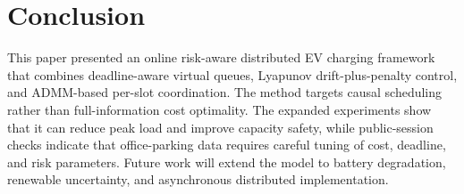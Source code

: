\documentclass[journal]{IEEEtran}
\begin{document}
\section{Conclusion}
This paper presented an online risk-aware distributed EV charging framework that combines deadline-aware virtual queues, Lyapunov drift-plus-penalty control, and ADMM-based per-slot coordination. The method targets causal scheduling rather than full-information cost optimality. The expanded experiments show that it can reduce peak load and improve capacity safety, while public-session checks indicate that office-parking data requires careful tuning of cost, deadline, and risk parameters. Future work will extend the model to battery degradation, renewable uncertainty, and asynchronous distributed implementation.



\end{document}
